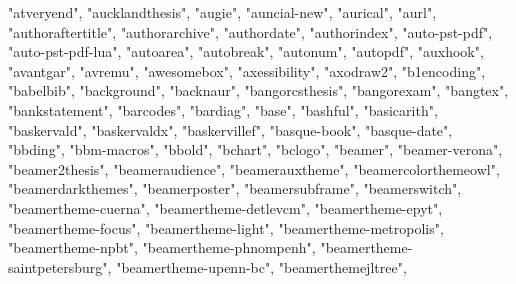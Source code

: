 \documentclass[
]{article}
\newenvironment{Shaded}{\begin{snugshade}}{\end{snugshade}}
\newcommand{\NormalTok}[1]{#1}
\newcommand{\StringTok}[1]{\textcolor[rgb]{0.31,0.60,0.02}{#1}}
\begin{document}
\begin{Shaded}
\begin{Highlighting}[]
\StringTok{"atveryend"}\NormalTok{, }\StringTok{"aucklandthesis"}\NormalTok{, }\StringTok{"augie"}\NormalTok{, }\StringTok{"auncial{-}new"}\NormalTok{, }\StringTok{"aurical"}\NormalTok{, }
\StringTok{"aurl"}\NormalTok{, }\StringTok{"authoraftertitle"}\NormalTok{, }\StringTok{"authorarchive"}\NormalTok{, }\StringTok{"authordate"}\NormalTok{, }\StringTok{"authorindex"}\NormalTok{, }
\StringTok{"auto{-}pst{-}pdf"}\NormalTok{, }\StringTok{"auto{-}pst{-}pdf{-}lua"}\NormalTok{, }\StringTok{"autoarea"}\NormalTok{, }\StringTok{"autobreak"}\NormalTok{, }
\StringTok{"autonum"}\NormalTok{, }\StringTok{"autopdf"}\NormalTok{, }\StringTok{"auxhook"}\NormalTok{, }\StringTok{"avantgar"}\NormalTok{, }\StringTok{"avremu"}\NormalTok{, }\StringTok{"awesomebox"}\NormalTok{, }
\StringTok{"axessibility"}\NormalTok{, }\StringTok{"axodraw2"}\NormalTok{, }\StringTok{"b1encoding"}\NormalTok{, }\StringTok{"babelbib"}\NormalTok{, }\StringTok{"background"}\NormalTok{, }
\StringTok{"backnaur"}\NormalTok{, }\StringTok{"bangorcsthesis"}\NormalTok{, }\StringTok{"bangorexam"}\NormalTok{, }\StringTok{"bangtex"}\NormalTok{, }\StringTok{"bankstatement"}\NormalTok{, }
\StringTok{"barcodes"}\NormalTok{, }\StringTok{"bardiag"}\NormalTok{, }\StringTok{"base"}\NormalTok{, }\StringTok{"bashful"}\NormalTok{, }\StringTok{"basicarith"}\NormalTok{, }\StringTok{"baskervald"}\NormalTok{, }
\StringTok{"baskervaldx"}\NormalTok{, }\StringTok{"baskervillef"}\NormalTok{, }\StringTok{"basque{-}book"}\NormalTok{, }\StringTok{"basque{-}date"}\NormalTok{, }
\StringTok{"bbding"}\NormalTok{, }\StringTok{"bbm{-}macros"}\NormalTok{, }\StringTok{"bbold"}\NormalTok{, }\StringTok{"bchart"}\NormalTok{, }\StringTok{"bclogo"}\NormalTok{, }\StringTok{"beamer"}\NormalTok{, }
\StringTok{"beamer{-}verona"}\NormalTok{, }\StringTok{"beamer2thesis"}\NormalTok{, }\StringTok{"beameraudience"}\NormalTok{, }\StringTok{"beamerauxtheme"}\NormalTok{, }
\StringTok{"beamercolorthemeowl"}\NormalTok{, }\StringTok{"beamerdarkthemes"}\NormalTok{, }\StringTok{"beamerposter"}\NormalTok{, }\StringTok{"beamersubframe"}\NormalTok{, }
\StringTok{"beamerswitch"}\NormalTok{, }\StringTok{"beamertheme{-}cuerna"}\NormalTok{, }\StringTok{"beamertheme{-}detlevcm"}\NormalTok{, }
\StringTok{"beamertheme{-}epyt"}\NormalTok{, }\StringTok{"beamertheme{-}focus"}\NormalTok{, }\StringTok{"beamertheme{-}light"}\NormalTok{, }
\StringTok{"beamertheme{-}metropolis"}\NormalTok{, }\StringTok{"beamertheme{-}npbt"}\NormalTok{, }\StringTok{"beamertheme{-}phnompenh"}\NormalTok{, }
\StringTok{"beamertheme{-}saintpetersburg"}\NormalTok{, }\StringTok{"beamertheme{-}upenn{-}bc"}\NormalTok{, }\StringTok{"beamerthemejltree"}\NormalTok{, }

\end{Highlighting}
\end{Shaded}
\end{document}
